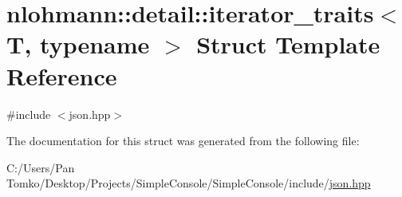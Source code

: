 \hypertarget{structnlohmann_1_1detail_1_1iterator__traits}{}\section{nlohmann\+::detail\+::iterator\+\_\+traits$<$ T, typename $>$ Struct Template Reference}
\label{structnlohmann_1_1detail_1_1iterator__traits}


{\ttfamily \#include $<$json.\+hpp$>$}



The documentation for this struct was generated from the following file\+:\begin{DoxyCompactItemize}
\item 
C\+:/\+Users/\+Pan Tomko/\+Desktop/\+Projects/\+Simple\+Console/\+Simple\+Console/include/\mbox{\hyperlink{json_8hpp}{json.\+hpp}}\end{DoxyCompactItemize}
